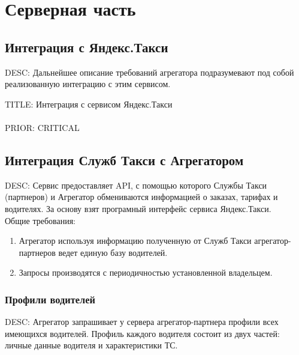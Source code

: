 \section{Серверная часть}

	\subsection{Интеграция с Яндекс.Такси}

		DESC: Дальнейшее описание требований агрегатора подразумевают под собой реализованную интеграцию с этим сервисом.  

		TITLE: Интеграция с сервисом Яндекс.Такси\\
		\\
		PRIOR: CRITICAL\\

	\subsection{Интеграция Служб Такси с Агрегатором}

		DESC: Сервис предоставляет API, с помощью которого Службы Такси (партнеров) и Агрегатор обмениваются информацией о заказах, тарифах и водителях. За основу взят програмный интерфейс сервиса Яндекс.Такси.\\

		Общие требования:
		\begin{enumerate}
			\item Агрегатор используя информацию полученную от Служб Такси агрегатор-партнеров ведет единую базу водителей.
			\item Запросы производятся с периодичностью установленной владельцем.
		\end{enumerate}

		\subsubsection{Профили водителей}

			DESC: Агрегатор запрашивает у сервера агрегатор-партнера профили всех имеющихся водителей. Профиль каждого водителя состоит из двух частей: личные данные водителя и характеристики ТС.

